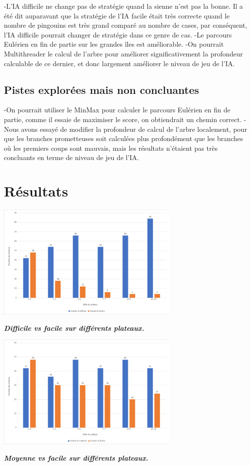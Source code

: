 \documentclass{report}
\begin{document}
-L'IA difficile ne change pas de stratégie quand la sienne n'est pas la bonne. Il a été dit auparavant que la stratégie de l'IA facile était très correcte quand le nombre de pingouins est très grand comparé au nombre de cases, par conséquent, l'IA difficile pourrait changer de stratégie dans ce genre de cas.
\newline
-Le parcours Eulérien en fin de partie sur les grandes îles est améliorable.
\newline 
-On pourrait Multithreader le calcul de l'arbre pour améliorer significativement la profondeur calculable de ce dernier, et donc largement améliorer le niveau de jeu de l'IA.

\section{Pistes explorées mais non concluantes}
-On pourrait utiliser le MinMax pour calculer le parcours Eulérien en fin de partie, comme il essaie de maximiser le score, on obtiendrait un chemin correct.
\newline
-Nous avons essayé de modifier la profondeur de calcul de l'arbre localement, pour que les branches prometteuses soit calculées plus profondément que les branches où les premiers coups sont mauvais, mais les résultats n’étaient pas très concluants en terme de niveau de jeu de l'IA.


\chapter{Résultats}

\begin{center}
  \includegraphics[width=9cm]{graph1.png}
\end{center} 
\textbf{\textit{Difficile vs facile sur différents plateaux.}}
\begin{center}
  \includegraphics[width=9cm]{graph2.png}
\end{center}
\textbf{\textit{Moyenne vs facile sur différents plateaux.}}
\end{document}

